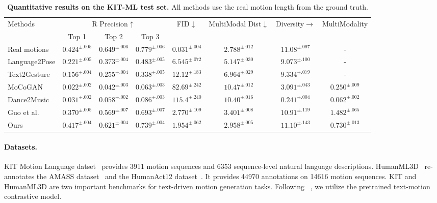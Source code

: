 \begin{table*}[ht]
\centering
\caption{\textbf{Quantitative results on the KIT-ML test set.} All methods use the real motion length from the ground truth.}
\label{tab:kit}
\setlength{\tabcolsep}{1.4mm}
{
\begin{tabular}{lccccccc}
\hline

\multirow{2}{2cm}{\centering Methods} & \multicolumn{3}{c}{\centering R Precision$\uparrow$} & \multirow{2}{1.5cm}{\centering FID$\downarrow$} & \multirow{2}{2.5cm}{\centering MultiModal Dist$\downarrow$} & \multirow{2}{2cm}{\centering Diversity$\rightarrow$} & \multirow{2}{2cm}{\centering MultiModality} \\
& Top 1 & Top 2 & Top 3 \\
\hline
Real motions & $0.424^{\pm .005}$ & $0.649^{\pm.006}$ & $0.779^{\pm.006}$ & $0.031^{\pm.004}$ & $2.788^{\pm.012}$ & $11.08^{\pm.097}$ & -\\ 
\hline

Language2Pose & $0.221^{\pm.005}$ & $0.373^{\pm.004}$ & $0.483^{\pm.005}$ & $6.545^{\pm.072}$ & $5.147^{\pm.030}$ & $9.073^{\pm.100}$ & - \\

Text2Gesture & $0.156^{\pm.004}$ & $0.255^{\pm.004}$ & $0.338^{\pm.005}$ & $12.12^{\pm.183}$ & $6.964^{\pm.029}$ & $9.334^{\pm.079}$ & - \\

MoCoGAN & $0.022^{\pm.002}$ & $0.042^{\pm.003}$ & $0.063^{\pm.003}$ & $82.69^{\pm.242}$ & $10.47^{\pm.012}$ & $3.091^{\pm.043}$ &
$0.250^{\pm.009}$ \\

Dance2Music & $0.031^{\pm.002}$ & $0.058^{\pm.002}$ & $0.086^{\pm.003}$ & $115.4^{\pm.240}$ & $10.40^{\pm.016}$ & $0.241^{\pm.004}$ & $0.062^{\pm.002}$ \\

Guo et al. & $0.370^{\pm.005}$ & $0.569^{\pm.007}$ & $0.693^{\pm.007}$ & $2.770^{\pm.109}$ & $3.401^{\pm.008}$ & $10.91^{\pm.119}$ & $1.482^{\pm.065}$ \\
\hline
Ours & $\mathbf{0.417^{\pm.004}}$ & $\mathbf{0.621^{\pm.004}}$ & $\mathbf{0.739^{\pm.004}}$ & $\mathbf{1.954^{\pm.062}}$ & $\mathbf{2.958^{\pm.005}}$ & $\mathbf{11.10^{\pm.143}}$ & $0.730^{\pm.013}$\\
\hline
\end{tabular}}
\end{table*}

\paragraph{Datasets.}\label{sec4_1_1} KIT Motion Language datset~\citep{plappert2016kit} provides 3911 motion sequences and 6353 sequence-level natural language descriptions. HumanML3D~\citep{guo2022generating} re-annotates the AMASS dataset~\citep{mahmood2019amass} and the HumanAct12 dataset~\citep{guo2020action2motion}. It provides 44970 annotations on 14616 motion sequences. KIT and HumanML3D are two important benchmarks for text-driven motion generation tasks. Following ~\cite{guo2022generating}, we utilize the pretrained text-motion contrastive model.

